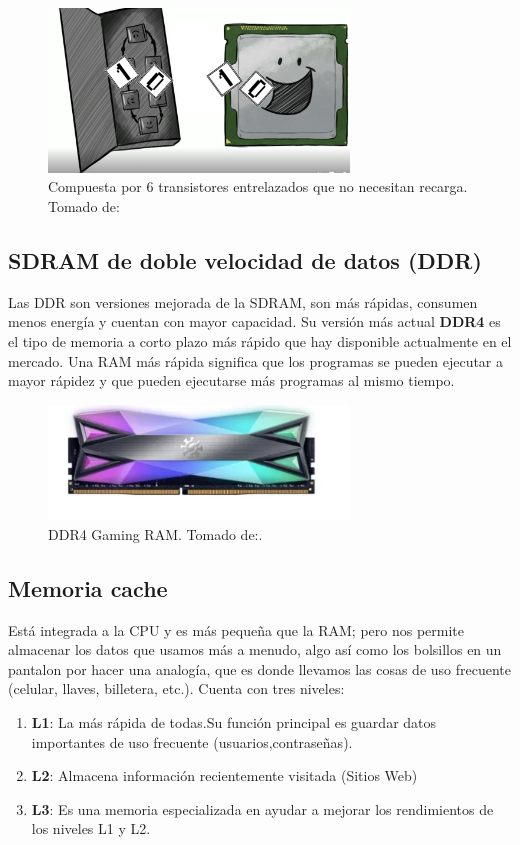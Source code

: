 \documentclass{article}
\begin{document}
\begin{figure}[h]
\includegraphics[width=8cm]{SDRAm.PNG}
\centering
\caption{Compuesta por 6 transistores entrelazados que no necesitan recarga. \centering Tomado de:\cite{TEDwebsite}}
\label{SDRAm.PNG}
\end{figure}
\subsection{SDRAM de doble velocidad de datos (DDR)}
Las DDR son versiones mejorada de la SDRAM, son más rápidas, consumen menos energía y cuentan con mayor capacidad. Su versión más actual \textbf{DDR4} es el tipo de memoria a corto plazo más rápido que hay disponible actualmente en el mercado. Una RAM más rápida significa que los programas se pueden ejecutar a mayor rápidez y que pueden ejecutarse más programas al mismo tiempo.
\vspace{0.2cm}
\begin{figure}[h]
\includegraphics[width=8cm]{DDR4.PNG}
\centering
\caption{DDR4 Gaming RAM. Tomado de:\cite{mercadolibre}. }
\label{DDR4.PNG}
\end{figure}
\newpage
\subsection{Memoria cache}
Está integrada a la CPU y es más pequeña que la RAM; pero nos permite almacenar los datos que usamos más a menudo, algo así como los bolsillos en un pantalon por hacer una analogía, que es donde llevamos las cosas de uso frecuente (celular, llaves, billetera, etc.). Cuenta con tres niveles:
\begin{enumerate}
\item \textbf{L1}: La más rápida de todas.Su función principal es guardar datos importantes de uso frecuente (usuarios,contraseñas).
\item \textbf{L2}: Almacena información recientemente visitada (Sitios Web)
\item \textbf{L3}: Es una memoria especializada en ayudar a mejorar los rendimientos de los niveles L1 y L2.
\end{enumerate}
\end{document}

